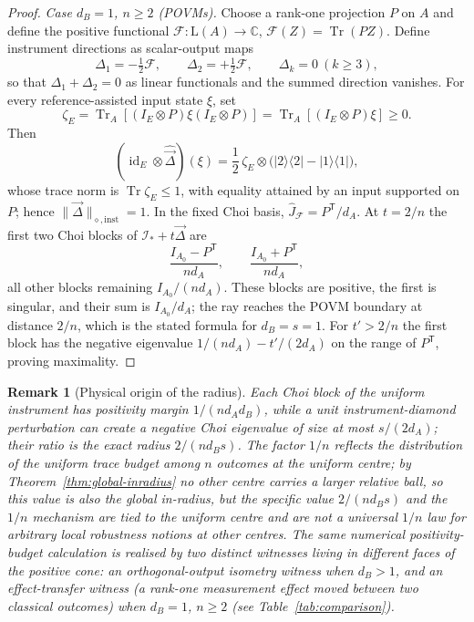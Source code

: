 \documentclass[11pt,a4paper]{article}
\newtheorem{remark}[theorem]{Remark}
\newcommand{\Lin}{\mathrm{L}}
\newcommand{\Tr}{\operatorname{Tr}}
\newcommand{\id}{\operatorname{id}}
\newcommand{\Jhat}{\widehat J}
\newcommand{\vD}{\vec{\Delta}}
\begin{document}
\begin{proof}
\emph{Case $d_B=1$, $n\ge2$ (POVMs).} Choose a rank-one projection $P$ on $A$ and define the positive functional $\mathcal F:\Lin(A)\to\mathbb C$, $\mathcal F(Z)=\Tr(PZ)$. Define instrument directions as scalar-output maps
\[
\Delta_1=-\tfrac12\mathcal F,\qquad \Delta_2=+\tfrac12\mathcal F,\qquad \Delta_k=0\ (k\ge3),
\]
so that $\Delta_1+\Delta_2=0$ as linear functionals and the summed direction vanishes. For every reference-assisted input state $\xi$, set
\[
\zeta_E=\Tr_A[(I_E\otimes P)\xi(I_E\otimes P)]=\Tr_A[(I_E\otimes P)\xi]\ge0.
\]
Then
\[
(\id_E\otimes\widehat{\vD})(\xi)
=\frac12\,\zeta_E\otimes\big(|2\rangle\langle2|-|1\rangle\langle1|\big),
\]
whose trace norm is $\Tr\zeta_E\le1$, with equality attained by an input supported on $P$; hence $\|\vD\|_{\diamond,\mathrm{inst}}=1$. In the fixed Choi basis, $\Jhat_{\mathcal F}=P^{\mathsf T}/d_A$. At $t=2/n$ the first two Choi blocks of $\mathcal I_*+t\vD$ are
\[
\frac{I_{A_0}-P^{\mathsf T}}{nd_A},\qquad
\frac{I_{A_0}+P^{\mathsf T}}{nd_A},
\]
all other blocks remaining $I_{A_0}/(nd_A)$. These blocks are positive, the first is singular, and their sum is $I_{A_0}/d_A$; the ray reaches the POVM boundary at distance $2/n$, which is the stated formula for $d_B=s=1$. For $t'>2/n$ the first block has the negative eigenvalue $1/(nd_A)-t'/(2d_A)$ on the range of $P^{\mathsf T}$, proving maximality.
\end{proof}

\begin{remark}[Physical origin of the radius]
\label{rem:physical-origin}
Each Choi block of the uniform instrument has positivity margin $1/(nd_Ad_B)$, while a unit instrument-diamond perturbation can create a negative Choi eigenvalue of size at most $s/(2d_A)$; their ratio is the exact radius $2/(nd_Bs)$. The factor $1/n$ reflects the distribution of the uniform trace budget among $n$ outcomes \emph{at the uniform centre}; by Theorem~\ref{thm:global-inradius} no other centre carries a larger relative ball, so this value is also the global in-radius, but the specific value $2/(nd_Bs)$ and the $1/n$ mechanism are tied to the uniform centre and are not a universal $1/n$ law for arbitrary local robustness notions at other centres. The same numerical positivity-budget calculation is realised by two \emph{distinct} witnesses living in different faces of the positive cone: an orthogonal-output isometry witness when $d_B>1$, and an effect-transfer witness (a rank-one measurement effect moved between two classical outcomes) when $d_B=1$, $n\ge2$ (see Table~\ref{tab:comparison}).
\end{remark}
\end{document}
